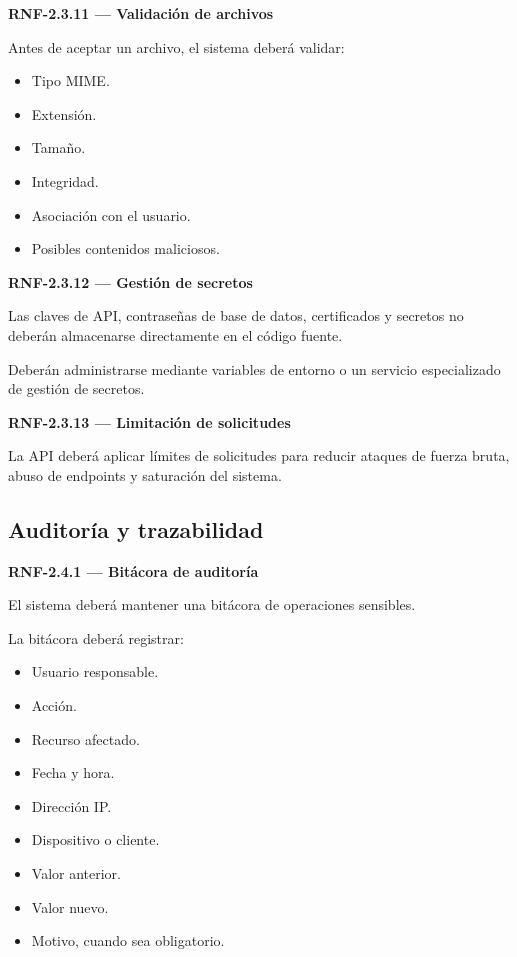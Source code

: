 \documentclass[12pt,a4paper]{article}
\newcommand{\RNF}[1]{\textbf{\color{secondary}RNF-#1}}
\newenvironment{requisito}[1]
{
\begin{center}
\begin{minipage}{0.96\textwidth}
\colorbox{requirement}{
\begin{minipage}{0.94\textwidth}
\textbf{#1}
\end{minipage}
}
\vspace{2mm}
}
{
\end{minipage}
\end{center}
}
\begin{document}
\begin{requisito}{\RNF{2.3.11} --- Validación de archivos}
Antes de aceptar un archivo, el sistema deberá validar:

\begin{itemize}[leftmargin=*]
\item Tipo MIME.
\item Extensión.
\item Tamaño.
\item Integridad.
\item Asociación con el usuario.
\item Posibles contenidos maliciosos.
\end{itemize}
\end{requisito}

\begin{requisito}{\RNF{2.3.12} --- Gestión de secretos}
Las claves de API, contraseñas de base de datos, certificados y secretos no
deberán almacenarse directamente en el código fuente.

Deberán administrarse mediante variables de entorno o un servicio especializado
de gestión de secretos.
\end{requisito}

\begin{requisito}{\RNF{2.3.13} --- Limitación de solicitudes}
La API deberá aplicar límites de solicitudes para reducir ataques de fuerza
bruta, abuso de endpoints y saturación del sistema.
\end{requisito}

\subsection{Auditoría y trazabilidad}

\begin{requisito}{\RNF{2.4.1} --- Bitácora de auditoría}
El sistema deberá mantener una bitácora de operaciones sensibles.

La bitácora deberá registrar:

\begin{itemize}[leftmargin=*]
\item Usuario responsable.
\item Acción.
\item Recurso afectado.
\item Fecha y hora.
\item Dirección IP.
\item Dispositivo o cliente.
\item Valor anterior.
\item Valor nuevo.
\item Motivo, cuando sea obligatorio.
\end{itemize}
\end{requisito}
\end{document}
